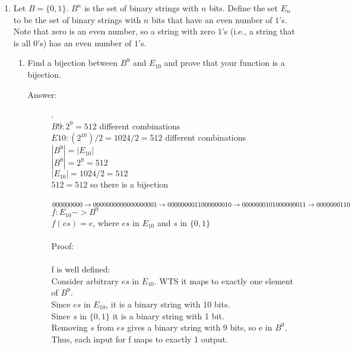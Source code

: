 \documentclass[12pt, oneside]{article}
\begin{document}
\begin{enumerate}




\item Let $B = \{0, 1\}$. $B^n$ is the set of binary strings with $n$ bits. Define the set $E_n$ to be the set of binary strings with $n$ bits that have an even number of $1$'s. Note that zero is an even number, so a string with zero $1$'s (i.e., a string that is all $0$'s) has an even number of $1$'s.
\begin{enumerate}
    \item Find a bijection between $B^9$ and $E_{10}$ and prove that your function is a bijection.
    \begin{description}
        \item[Answer:] .\\
        $B9: 2^9 = 512$ different combinations\\
        $E10: (2^10)/2 = 1024/2 = 512$ different combinations\\
        $|B^9| = |E_10|$\\
        $|B^9| = 2^9 = 512$\\
        $|E_10| = 1024/2 = 512$\\
        $512 = 512$ so there is a bijection\\\\
        $000000000 \rightarrow 0000000000\\
        000000001 \rightarrow 0000000011\\
        000000010 \rightarrow 0000000101\\
        000000011 \rightarrow 0000000110$\\
        $f: E_10 -> B^9$\\
        $f(es) = e$, where $es$ in $E_{10}$ and $s$ in $\{0,1\}$\\\\
        Proof:\\\\
        f is well defined:\\
        Consider arbitrary $es$ in $E_{10}$. WTS it maps to exactly one element of $B^9$.\\
        Since $es$ in $E_{10}$, it is a binary string with 10 bits.\\
        Since $s$ in $\{0,1\}$ it is a binary string with 1 bit.\\
        Removing $s$ from $es$ gives a binary string with 9 bits, so e in $B^9$.\\
        Thus, each input for f maps to exactly 1 output.\\\\

\end{description}
\end{enumerate}
\end{enumerate}
\end{document}
